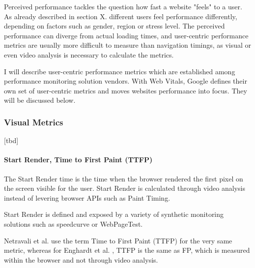 Perceived performance tackles the question how fast a website "feels" to a user.
As already described in section X. different users feel performance differently, depending on factors such as gender, region or stress level.
The perceived performance can diverge from actual loading times, and user-centric performance metrics are usually more difficult to measure than navigation timings, as visual or even video analysis is necessary to calculate the metrics. %

I will describe user-centric performance metrics which are established among performance monitoring solution vendors.
With Web Vitals, Google defines their own set of user-centric metrics and moves websites performance into focus.
They will be discussed below.




\subsubsection{Visual Metrics}

[tbd]








\paragraph{Start Render, Time to First Paint (TTFP)}

The Start Render time is the time when the browser rendered the first pixel on the screen visible for the user.
Start Render is calculated through video analysis instead of levering browser APIs such as Paint Timing.

Start Render is defined and exposed by a variety of synthetic monitoring solutions such as speedcurve or WebPageTest.

Netravali et al. use the term Time to First Paint (TTFP) for the very same metric, %
whereas for Enghardt et al. , TTFP is the same as FP, which is measured within the browser and not through video analysis. %

